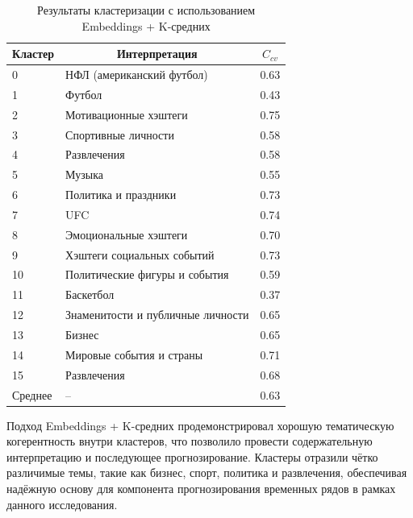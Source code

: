 \documentclass[14pt,a4paper]{article}
\begin{document}
\begin{table}[]
\centering
\begin{tabular}{|l|l|l|}
\hline
\multicolumn{1}{|c|}{\textbf{Кластер}} & \multicolumn{1}{c|}{\textbf{Интерпретация}} & \multicolumn{1}{c|}{\textbf{$C_{cv}$}} \\ \hline
0  & НФЛ (американский футбол)                 & 0.63 \\ \hline
1  & Футбол                                   & 0.43 \\ \hline
2  & Мотивационные хэштеги                    & 0.75 \\ \hline
3  & Спортивные личности                      & 0.58 \\ \hline
4  & Развлечения                              & 0.58 \\ \hline
5  & Музыка                                   & 0.55 \\ \hline
6  & Политика и праздники                     & 0.73 \\ \hline
7  & UFC                                      & 0.74 \\ \hline
8  & Эмоциональные хэштеги                   & 0.70 \\ \hline
9  & Хэштеги социальных событий              & 0.73 \\ \hline
10 & Политические фигуры и события           & 0.59 \\ \hline
11 & Баскетбол                                & 0.37 \\ \hline
12 & Знаменитости и публичные личности       & 0.65 \\ \hline
13 & Бизнес                                   & 0.65 \\ \hline
14 & Мировые события и страны                & 0.71 \\ \hline
15 & Развлечения                              & 0.68 \\ \hline
Среднее & –                                   & 0.63 \\ \hline
\end{tabular}
\caption{Результаты кластеризации с использованием Embeddings + K-средних}
\label{tab:KmeansClusters}
\end{table}








Подход Embeddings + K-средних продемонстрировал хорошую тематическую когерентность внутри кластеров, что позволило провести содержательную интерпретацию и последующее прогнозирование. Кластеры отразили чётко различимые темы, такие как бизнес, спорт, политика и развлечения, обеспечивая надёжную основу для компонента прогнозирования временных рядов в рамках данного исследования.
\end{document}
